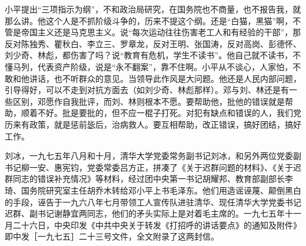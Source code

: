 小平提出“三项指示为纲”，不和政治局研究，在国务院也不商量，也不报告我，就那么讲。他这个人是不抓阶级斗争的，历来不提这个纲。还是“白猫，黑猫”啊，不管是帝国主义还是马克思主义。说“每次运动往往伤害老工人和有经验的干部”，那反对陈独秀、瞿秋白、李立三、罗章龙，反对王明、张国涛，反对高岗、彭德怀、刘少奇、林彪，都伤害了吗？说“教育有危机，学生不读书”。他自己就不读书，不懂马列，代表资产阶级，说是“永不翻案”，靠不住啊。小平从不谈心，人家怕，不敢和他讲话，也不听群众的意见。当领导此作风是大问题。他还是人民内部问题，引导得好，可以不走到对抗方面去（如刘少奇、林彪那样）。邓与刘、林还是有一些区别，邓愿作自我批评，而刘、林则根本不愿。要帮助他，批他的错误就是帮助，顺着不好。批是要批的，但不应一棍子打死。对犯有缺点和错误的人，我们党历来有政策，就是惩前毖后，治病救人。要互相帮助，改正错误，搞好团结，搞好工作。

\begin{maonote}
刘冰，一九七五年八月和十月，清华大学党委常务副书记刘冰，和另外两位党委副书记柳一安、惠宪钧，党委常委吕方正，拼凑了《关于迟群问题的材料》、《关于迟群同志的错误补充情况》等材料，经过团中央第一书记胡耀邦、教育部副部长李琦、国务院研究室主任胡乔木转给邓小平上书毛泽东。他们用造谣诬蔑、颠倒黑白的手段，诬告于一九六八年七月带领工人宣传队进驻清华、现任清华大学党委书记迟群、副书记谢静宜两同志，他们的矛头实际上是对着毛主席的。一九七五年十一月二十六日，中央印发《中共中央关于转发《打招呼的讲话要点》的通知及附件》即中发［一九七五］二十三号文件，全文附录了这两封信。


\end{maonote}
